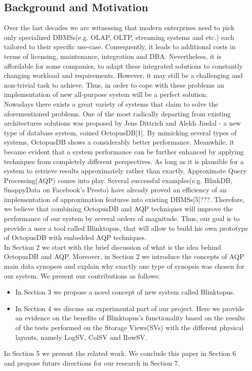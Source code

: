 \documentclass[10pt, conference, compsocconf]{IEEEtran}
\begin{document}
\subsection{Background and Motivation}
Over the last decades we are witnessing that modern enterprises need to pick only  specialized DBMSs(e.g. OLAP, OLTP, streaming systems and etc.) each tailored to their specific use-case. Consequently, it leads to additional costs in terms of licensing, maintenance, integration and DBA. Nevertheless, it is affordable for some companies, to adapt these integrated solutions to constantly changing workload and requirements. However, it may still be a challenging and non-trivial task to achieve. Thus, in order to cope with these problems an implementation of new all-purpose system will be a perfect solution. \\ Nowadays there exists a great variety of systems that claim to solve the aforementioned problems. One of the most radically departing from existing architectures solutions was proposed by Jens Dittrich and Alekh Jindal - a new type of database system, coined OctopusDB[1]. By mimicking several types of systems, OctopusDB shows a considerably better performance. Meanwhile, it became evident that a system performance can be further enhanced by applying techniques from completely different perspectives. As long as it is plausible for a system to retrieve results approximately rather than exactly, Approximate Query Processing(AQP) comes into play. Several successful examples(e.g. BlinkDB, SnappyData on Facebook's Presto) have already proved an efficiency of an implementation of approximation features into existing DBMSs[5]???. Therefore, we believe that combining OctopusDB and AQP techniques will improve the performance of our system by several orders of magnitude. 
Thus, our goal is to provide a user a tool called Blinktopus, that will allow  to build his own prototype of OctopusDB with embedded AQP techniques.\\
In Section 2 we start with the brief discussion of what is the idea behind OctopusDB and AQP. Moreover, in Section 2 we introduce the concepts of AQP main data synopses and explain why exactly one type of synopsis was chosen for our system. We present our contributions as follows:
\begin{itemize}
\vspace{0.05 cm}
\item{In Section 3 we propose a novel concept of new system called Blinktopus.}
\item{In Section 4 we discuss an experimental part of our project. Here we provide an evidence on the benefits of Blinktopus's functionality based on the results of the tests performed on the Storage Views(SVs) with the different physical layouts, namely LogSV, ColSV and RowSV.}
\end{itemize}
In Section 5 we present the related work. We conclude this paper in Section 6 and propose future directions for our research in Section 7.
\end{document}
